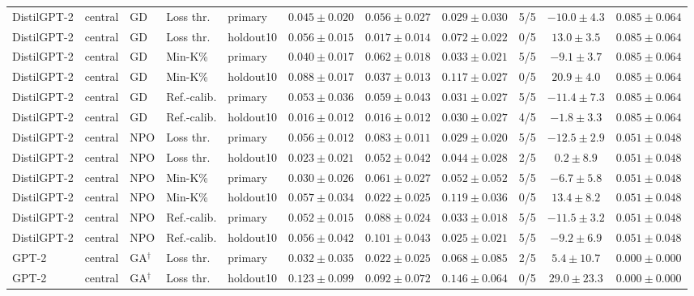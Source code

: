 {\begin{longtable}{@{\extracolsep{\fill}}lllllcccccc@{}}
DistilGPT-2 & central & GD & Loss thr. & primary & $0.045 \pm 0.020$ & $0.056 \pm 0.027$ & $0.029 \pm 0.030$ & 5/5 & $-10.0 \pm 4.3$ & $0.085 \pm 0.064$ \\
DistilGPT-2 & central & GD & Loss thr. & holdout10 & $0.056 \pm 0.015$ & $0.017 \pm 0.014$ & $0.072 \pm 0.022$ & 0/5 & $13.0 \pm 3.5$ & $0.085 \pm 0.064$ \\
DistilGPT-2 & central & GD & Min-K\% & primary & $0.040 \pm 0.017$ & $0.062 \pm 0.018$ & $0.033 \pm 0.021$ & 5/5 & $-9.1 \pm 3.7$ & $0.085 \pm 0.064$ \\
DistilGPT-2 & central & GD & Min-K\% & holdout10 & $0.088 \pm 0.017$ & $0.037 \pm 0.013$ & $0.117 \pm 0.027$ & 0/5 & $20.9 \pm 4.0$ & $0.085 \pm 0.064$ \\
DistilGPT-2 & central & GD & Ref.-calib. & primary & $0.053 \pm 0.036$ & $0.059 \pm 0.043$ & $0.031 \pm 0.027$ & 5/5 & $-11.4 \pm 7.3$ & $0.085 \pm 0.064$ \\
DistilGPT-2 & central & GD & Ref.-calib. & holdout10 & $0.016 \pm 0.012$ & $0.016 \pm 0.012$ & $0.030 \pm 0.027$ & 4/5 & $-1.8 \pm 3.3$ & $0.085 \pm 0.064$ \\
DistilGPT-2 & central & NPO & Loss thr. & primary & $0.056 \pm 0.012$ & $0.083 \pm 0.011$ & $0.029 \pm 0.020$ & 5/5 & $-12.5 \pm 2.9$ & $0.051 \pm 0.048$ \\
DistilGPT-2 & central & NPO & Loss thr. & holdout10 & $0.023 \pm 0.021$ & $0.052 \pm 0.042$ & $0.044 \pm 0.028$ & 2/5 & $0.2 \pm 8.9$ & $0.051 \pm 0.048$ \\
DistilGPT-2 & central & NPO & Min-K\% & primary & $0.030 \pm 0.026$ & $0.061 \pm 0.027$ & $0.052 \pm 0.052$ & 5/5 & $-6.7 \pm 5.8$ & $0.051 \pm 0.048$ \\
DistilGPT-2 & central & NPO & Min-K\% & holdout10 & $0.057 \pm 0.034$ & $0.022 \pm 0.025$ & $0.119 \pm 0.036$ & 0/5 & $13.4 \pm 8.2$ & $0.051 \pm 0.048$ \\
DistilGPT-2 & central & NPO & Ref.-calib. & primary & $0.052 \pm 0.015$ & $0.088 \pm 0.024$ & $0.033 \pm 0.018$ & 5/5 & $-11.5 \pm 3.2$ & $0.051 \pm 0.048$ \\
DistilGPT-2 & central & NPO & Ref.-calib. & holdout10 & $0.056 \pm 0.042$ & $0.101 \pm 0.043$ & $0.025 \pm 0.021$ & 5/5 & $-9.2 \pm 6.9$ & $0.051 \pm 0.048$ \\
GPT-2 & central & GA$^{\dagger}$ & Loss thr. & primary & $0.032 \pm 0.035$ & $0.022 \pm 0.025$ & $0.068 \pm 0.085$ & 2/5 & $5.4 \pm 10.7$ & $0.000 \pm 0.000$ \\
GPT-2 & central & GA$^{\dagger}$ & Loss thr. & holdout10 & $0.123 \pm 0.099$ & $0.092 \pm 0.072$ & $0.146 \pm 0.064$ & 0/5 & $29.0 \pm 23.3$ & $0.000 \pm 0.000$ \\

\end{longtable}}
